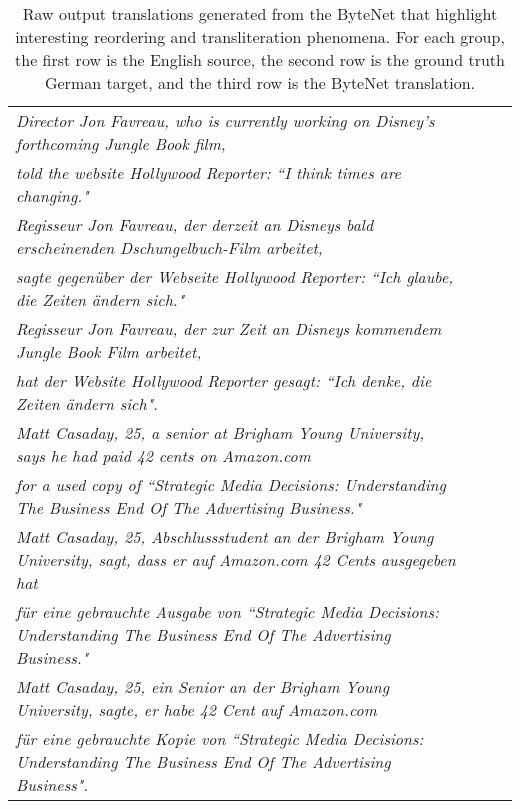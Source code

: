 \documentclass{article}
\begin{document}
\begin{table*}[t]
\small
\begin{center}
  \begin{tabular}{lccc}
    \toprule
    \textit{Director Jon Favreau, who is currently working on Disney's forthcoming Jungle Book film,} \\ \textit{told the website Hollywood Reporter: ``I think times are changing."}  \vspace{0.2cm} \\ 
    \textit{Regisseur Jon Favreau, der derzeit an Disneys bald erscheinenden Dschungelbuch-Film arbeitet,} \\ \textit{sagte gegenüber der Webseite Hollywood Reporter: ``Ich glaube, die Zeiten \"andern sich."}  \vspace{0.2cm} \\ 
    \textit{Regisseur Jon Favreau, der zur Zeit an Disneys kommendem Jungle Book Film arbeitet,} \\ \textit{ hat der Website Hollywood Reporter gesagt: ``Ich denke, die Zeiten \"andern sich".}  \\
    \midrule
    \textit{Matt Casaday, 25, a senior at Brigham Young University, says he had paid 42 cents on Amazon.com} \\ \textit{for a used copy of ``Strategic Media Decisions: Understanding The Business End Of The Advertising Business."} \vspace{0.2cm} \\
    \textit{Matt Casaday, 25, Abschlussstudent an der Brigham Young University, sagt, dass er auf Amazon.com 42 Cents ausgegeben hat} \\ \textit{f\"ur eine gebrauchte Ausgabe von ``Strategic Media Decisions: Understanding The Business End Of The Advertising Business."} \vspace{0.2cm}
    \\
    \textit{Matt Casaday, 25, ein Senior an der Brigham Young University, sagte, er habe 42 Cent auf Amazon.com} \\ \textit{f\"ur eine gebrauchte Kopie von ``Strategic Media Decisions: Understanding The Business End Of The Advertising Business".}  \\ 
      \bottomrule
  \end{tabular}
  \end{center}
\caption{Raw output translations generated from the ByteNet that highlight interesting reordering and transliteration phenomena. For each group, the first row is the English source, the second row is the ground truth German target, and the third row is the ByteNet translation.}
\label{tab:samples}
\end{table*}
\end{document}
